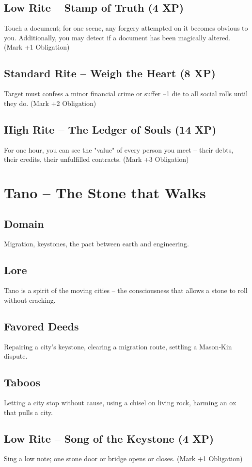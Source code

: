 \documentclass[11pt]{book}
\begin{document}
\subsection*{Low Rite -- Stamp of Truth (4 XP)}
Touch a document; for one scene, any forgery attempted on it becomes obvious to you. Additionally, you may detect if a document has been magically altered. (Mark +1 Obligation)
\subsection*{Standard Rite -- Weigh the Heart (8 XP)}
Target must confess a minor financial crime or suffer --1 die to all social rolls until they do. (Mark +2 Obligation)
\subsection*{High Rite -- The Ledger of Souls (14 XP)}
For one hour, you can see the "value" of every person you meet -- their debts, their credits, their unfulfilled contracts. (Mark +3 Obligation)

\section{Tano -- The Stone that Walks}
\subsection*{Domain}
Migration, keystones, the pact between earth and engineering.
\subsection*{Lore}
Tano is a spirit of the moving cities -- the consciousness that allows a stone to roll without cracking.
\subsection*{Favored Deeds}
Repairing a city's keystone, clearing a migration route, settling a Mason‑Kin dispute.
\subsection*{Taboos}
Letting a city stop without cause, using a chisel on living rock, harming an ox that pulls a city.
\subsection*{Low Rite -- Song of the Keystone (4 XP)}
Sing a low note; one stone door or bridge opens or closes. (Mark +1 Obligation)
\end{document}
